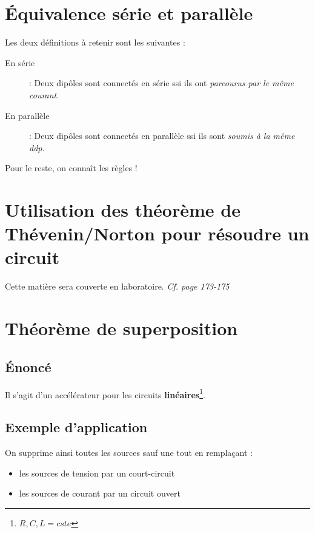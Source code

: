 \documentclass[british,french,11pt, a4paper, openany]{book}
\begin{document}
		\setcounter{section}{4}
		\section{Équivalence série et parallèle}
		Les deux définitions à retenir sont les suivantes :
		\begin{description}
			\item[En série] : Deux dipôles sont connectés en série ssi ils ont \textit{parcourus par le même courant}.
			\item[En parallèle] : Deux dipôles sont connectés en parallèle ssi ils sont \textit{soumis à la même ddp}.
		\end{description}
		Pour le reste, on connaît les règles !
		
		\section{Utilisation des théorème de Thévenin/Norton pour résoudre un circuit}
		Cette matière sera couverte en laboratoire. \textit{Cf. page 173-175}
		
		\setcounter{section}{7}
		\section{Théorème de superposition}
		\subsection{Énoncé}
		Il s'agit d'un accélérateur pour les circuits \textbf{linéaires}\footnote{$R, C, L = cste$}.\\
		
		
		\subsection{Exemple d'application}
		On supprime ainsi toutes les sources sauf une tout en remplaçant :
		\begin{itemize}
			\item les sources de tension par un court-circuit
			\item les sources de courant par un circuit ouvert
		\end{itemize}
		
\end{document}
